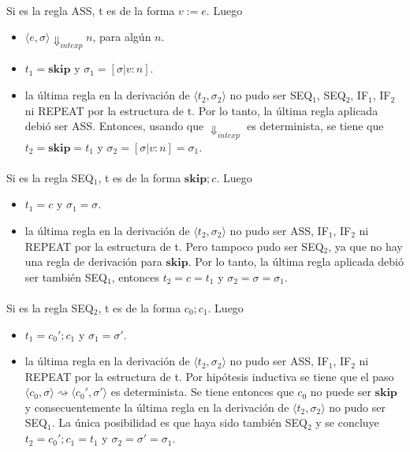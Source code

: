\documentclass{article}
\begin{document}
\paragraph{}
Si es la regla ASS, t es de la forma $v:=e$. Luego
\begin{itemize}
\item
$\langle e, \sigma \rangle \Downarrow_{intexp} n$, para alg\'un $n$.
\item
$t_1 = \mathbf{skip}$ y $\sigma_1 = [ \sigma | v : n ]$.
\item
la \'ultima regla en la derivaci\'on de $\langle t_2, \sigma_2 \rangle$ no pudo ser SEQ$_1$, SEQ$_2$, IF$_1$, IF$_2$ ni REPEAT por la estructura de t. Por lo tanto, la \'ultima regla aplicada debi\'o ser ASS. Entonces, usando que $\Downarrow_{intexp}$ es determinista, se tiene que $t_2 = \mathbf{skip} = t_1$ y $\sigma_2 = [ \sigma | v : n ] = \sigma_1$.
\end{itemize}

\paragraph{}
Si es la regla SEQ$_1$, t es de la forma $\mathbf{skip};c$. Luego
\begin{itemize}
\item
$t_1 = c$ y $\sigma_1 = \sigma$.
\item
la \'ultima regla en la derivaci\'on de $\langle t_2, \sigma_2 \rangle$ no pudo ser ASS, IF$_1$, IF$_2$ ni REPEAT por la estructura de t. Pero tampoco pudo ser SEQ$_2$, ya que no hay una regla de derivaci\'on para $\mathbf{skip}$. Por lo tanto, la \'ultima regla aplicada debi\'o ser tambi\'en SEQ$_1$, entonces $ t_2 = c = t_1$ y $\sigma_2 = \sigma = \sigma_1$.
\end{itemize}

\paragraph{}
Si es la regla SEQ$_2$, t es de la forma $c_0;c_1$. Luego
\begin{itemize}
\item
$t_1 = c_0';c_1 $ y $ \sigma_1 = \sigma'$.
\item
la \'ultima regla en la derivaci\'on de $ \langle t_2, \sigma_2 \rangle $ no pudo ser ASS, IF$_1$, IF$_2$ ni REPEAT por la estructura de t. Por hip\'otesis inductiva se tiene que el paso $\langle c_0, \sigma \rangle \rightsquigarrow \langle c_0',  \sigma' \rangle$ es determinista. Se tiene entonces que $c_0$ no puede ser $ \mathbf{skip}$ y consecuentemente la \'ultima regla en la derivaci\'on de $\langle t_2, \sigma_2 \rangle$ no pudo ser SEQ$_1$. La \'unica posibilidad es que haya sido tambi\'en SEQ$_2$ y se concluye $t_2 = c_0';c_1 = t_1$ y $\sigma_2 = \sigma' = \sigma_1$. 
\end{itemize}
\end{document}
